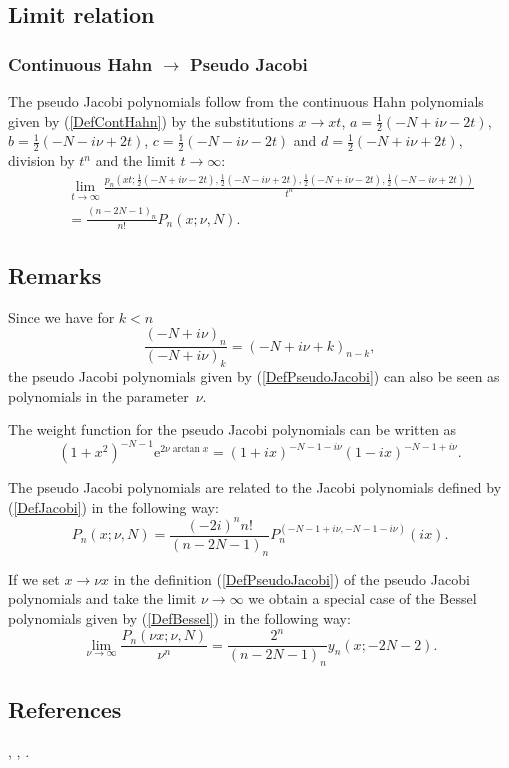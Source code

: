 \documentclass[envcountchap,graybox]{svmono}
\newcounter{rom}
\newcommand{\e}{\textrm{e}}
\begin{document}
\subsection*{Limit relation}

\subsubsection*{Continuous Hahn $\rightarrow$ Pseudo Jacobi}
The pseudo Jacobi polynomials follow from the continuous Hahn polynomials given by
(\ref{DefContHahn}) by the substitutions $x\rightarrow xt$, $a=\frac{1}{2}(-N+i\nu-2t)$,
$b=\frac{1}{2}(-N-i\nu+2t)$, $c=\frac{1}{2}(-N-i\nu-2t)$ and $d=\frac{1}{2}(-N+i\nu+2t)$,
division by $t^n$ and the limit $t\rightarrow\infty$:
\begin{eqnarray*}
& &\lim_{t\rightarrow\infty}\frac{p_n(xt;\frac{1}{2}(-N+i\nu-2t),\frac{1}{2}(-N-i\nu+2t),
\frac{1}{2}(-N+i\nu-2t),\frac{1}{2}(-N-i\nu+2t))}{t^n}\\
& &{}=\frac{(n-2N-1)_n}{n!}P_n(x;\nu,N).
\end{eqnarray*}

\subsection*{Remarks}
Since we have for $k<n$
$$\frac{(-N+i\nu)_n}{(-N+i\nu)_k}=(-N+i\nu+k)_{n-k},$$
the pseudo Jacobi polynomials given by (\ref{DefPseudoJacobi}) can also be seen as
polynomials in the parameter~$\nu$.

\noindent
The weight function for the pseudo Jacobi polynomials can be written as
$$(1+x^2)^{-N-1}\e^{2\nu\arctan x}=(1+ix)^{-N-1-i\nu}(1-ix)^{-N-1+i\nu}.$$

\noindent
The pseudo Jacobi polynomials are related to the Jacobi polynomials defined by
(\ref{DefJacobi}) in the following way:
$$P_n(x;\nu,N)=\frac{(-2i)^nn!}{(n-2N-1)_n}P_n^{(-N-1+i\nu,-N-1-i\nu)}(ix).$$

\noindent
If we set $x\rightarrow\nu x$ in the definition (\ref{DefPseudoJacobi}) of the pseudo Jacobi
polynomials and take the limit $\nu\rightarrow\infty$ we obtain a special case of the Bessel
polynomials given by (\ref{DefBessel}) in the following way:
$$\lim\limits_{\nu\rightarrow\infty}\frac{P_n(\nu x;\nu,N)}{\nu^n}
=\frac{2^n}{(n-2N-1)_n}y_n(x;-2N-2).$$

\subsection*{References}
\cite{Askey87}, \cite{BorodinOlshanski}, \cite{Lesky96}.
\end{document}
